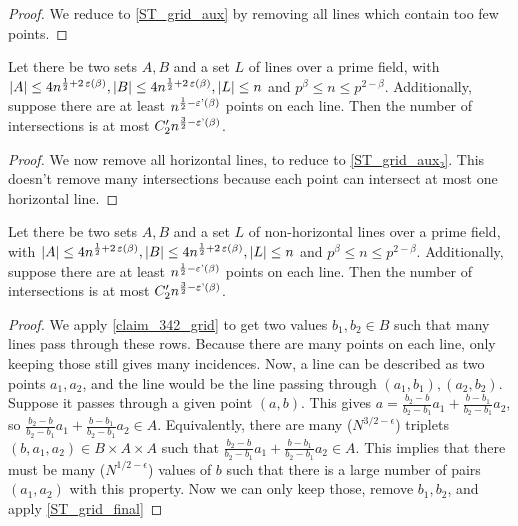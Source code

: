 \begin{proof}
    \leanok
    We reduce to \ref{ST_grid_aux} by removing all lines which contain too few points.
\end{proof}

\begin{theorem}
    \label{ST_grid_aux}
    \leanok
    Let there be two sets $A, B$ and a set $L$ of lines over a prime field, 
    with $|A| \leq 4n^{\frac12 + 2\operatorname{\varepsilon}(\beta)}, |B| \leq 4n^{\frac12 + 2\operatorname{\varepsilon}(\beta)}, |L| \leq n$ and $p^\beta \leq n \leq p^{2 - \beta}$.
    Additionally, suppose there are at least $n^{\frac12 - \operatorname{\varepsilon'}(\beta)}$ points on each line.
    Then the number of intersections is at most $C'_2 n^{\frac32 - \operatorname{\varepsilon'}(\beta)}$.
\end{theorem}

\begin{proof}
    \leanok
    We now remove all horizontal lines, to reduce to \ref{ST_grid_aux₂}.
    This doesn't remove many intersections because each point can intersect at most one horizontal line.
\end{proof}

\begin{theorem}
    \label{ST_grid_aux₂}
    \leanok
    Let there be two sets $A, B$ and a set $L$ of non-horizontal lines over a prime field, 
    with $|A| \leq 4n^{\frac12 + 2\operatorname{\varepsilon}(\beta)}, |B| \leq 4n^{\frac12 + 2\operatorname{\varepsilon}(\beta)}, |L| \leq n$ and $p^\beta \leq n \leq p^{2 - \beta}$.
    Additionally, suppose there are at least $n^{\frac12 - \operatorname{\varepsilon'}(\beta)}$ points on each line.
    Then the number of intersections is at most $C'_2 n^{\frac32 - \operatorname{\varepsilon'}(\beta)}$.
\end{theorem}

\begin{proof}
    \leanok
    We apply \ref{claim_342_grid} to get two values $b_1, b_2 \in B$ such that many lines pass
    through these rows. Because there are many points on each line, only keeping those still gives many
    incidences. Now, a line can be described as two points $a_1, a_2$, and the line would be the line passing through
    $(a_1, b_1), (a_2, b_2)$. Suppose it passes through a given point $(a, b)$. This gives
    $a = \frac{b_2 - b}{b_2 - b_1} a_1 + \frac{b - b_1}{b_2 - b_1} a_2$, so
    $\frac{b_2 - b}{b_2 - b_1} a_1 + \frac{b - b_1}{b_2 - b_1} a_2 \in A$. Equivalently, there are many ($N^{3/2 - \epsilon}$) triplets
    $(b, a_1, a_2) \in B \times A \times A$ such that $\frac{b_2 - b}{b_2 - b_1} a_1 + \frac{b - b_1}{b_2 - b_1} a_2 \in A$.
    This implies that there must be many ($N^{1/2 - \epsilon}$) values of $b$ such that there is a large number of pairs
    $(a_1, a_2)$ with this property. Now we can only keep those, remove $b_1, b_2$, and apply \ref{ST_grid_final}
\end{proof}


